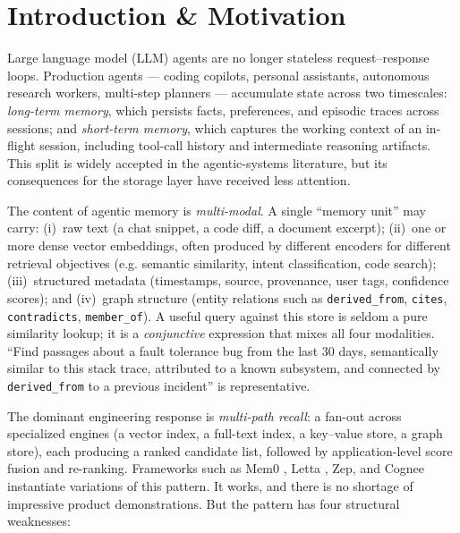 \documentclass[sigconf,nonacm,review]{acmart}
\theoremstyle{plain}
\theoremstyle{definition}
\theoremstyle{remark}
\begin{document}
\section{Introduction \& Motivation}\label{sec:intro}

Large language model (LLM) agents are no longer stateless
request--response loops. Production agents --- coding copilots, personal
assistants, autonomous research workers, multi-step planners ---
accumulate state across two timescales: \emph{long-term memory}, which
persists facts, preferences, and episodic traces across sessions; and
\emph{short-term memory}, which captures the working context of an
in-flight session, including tool-call history and intermediate
reasoning artifacts. This split is widely accepted in the
agentic-systems literature, but its consequences for the storage layer
have received less attention.

The content of agentic memory is \emph{multi-modal}. A
single ``memory unit'' may carry: (i)~raw text (a chat snippet, a code
diff, a document excerpt); (ii)~one or more dense vector embeddings,
often produced by different encoders for different retrieval objectives
(e.g. semantic similarity, intent classification, code search);
(iii)~structured metadata (timestamps, source, provenance, user tags,
confidence scores); and (iv)~graph structure (entity relations such as
\texttt{derived\_from}, \texttt{cites}, \texttt{contradicts},
\texttt{member\_of}). A useful query against this store is seldom a pure
similarity lookup; it is a \emph{conjunctive} expression that mixes all
four modalities. ``Find passages about a fault tolerance bug from the
last 30 days, semantically similar to this stack trace, attributed to a
known subsystem, and connected by \texttt{derived\_from} to a previous
incident'' is representative.

The dominant engineering response is \emph{multi-path recall}: a
fan-out across specialized engines (a vector index, a full-text index,
a key--value store, a graph store), each producing a ranked candidate
list, followed by application-level score fusion and re-ranking.
Frameworks such as Mem0 \cite{mem0}, Letta \cite{letta}, Zep, and
Cognee instantiate variations
of this pattern. It works, and there is no shortage of impressive
product demonstrations. But the pattern has four structural weaknesses:
\end{document}
